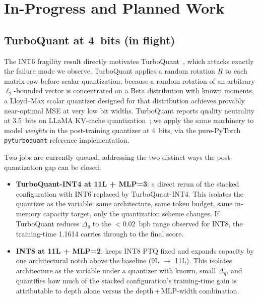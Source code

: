 \documentclass[11pt, letterpaper]{article}
\begin{document}
\section{In-Progress and Planned Work}

\subsection{TurboQuant at 4~bits (in flight)}

The INT6 fragility result directly motivates TurboQuant~\cite{turboquant2024},
which attacks exactly the failure mode we observe. TurboQuant
applies a random rotation $R$ to each matrix row before scalar
quantization; because a random rotation of an arbitrary
$\ell_2$-bounded vector is concentrated on a Beta distribution
with known moments, a Lloyd--Max scalar quantizer designed for
that distribution achieves provably near-optimal MSE at very
low bit widths. TurboQuant reports quality neutrality at
3.5~bits on LLaMA KV-cache quantization~\cite{turboquant2024};
we apply the same machinery to model \emph{weights} in the
post-training quantizer at 4~bits, via the pure-PyTorch
\texttt{pyturboquant} reference implementation.

Two jobs are currently queued, addressing the two distinct
ways the post-quantization gap can be closed:
\begin{itemize}[leftmargin=*, topsep=0pt, itemsep=1pt]
    \item \textbf{TurboQuant-INT4 at 11L + MLP=3}: a direct
          rerun of the stacked configuration with INT6 replaced
          by TurboQuant-INT4. This isolates the quantizer as
          the variable: same architecture, same token budget,
          same in-memory capacity target, only the
          quantization scheme changes. If TurboQuant reduces
          $\Delta_q$ to the $<0.02$~bpb range observed for INT8,
          the training-time 1.1614 carries through to the
          final score.
    \item \textbf{INT8 at 11L + MLP=2}: keeps INT8 PTQ fixed and
          expands capacity by one architectural notch above the
          baseline (9L $\rightarrow$ 11L). This isolates
          architecture as the variable under a quantizer with
          known, small $\Delta_q$, and quantifies how much of
          the stacked configuration's training-time gain is
          attributable to depth alone versus the
          depth\,$+$\,MLP-width combination.
\end{itemize}
\end{document}
